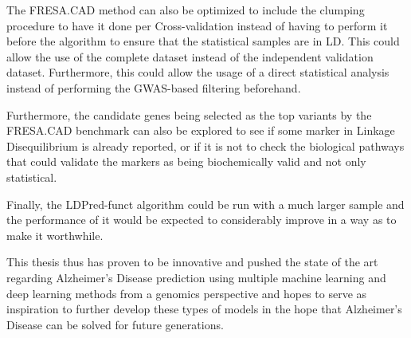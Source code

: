 The FRESA.CAD method can also be optimized to include the clumping procedure to have it done per Cross-validation instead of having to perform it before the algorithm to ensure that the statistical samples are in LD. This could allow the use of the complete dataset instead of the independent validation dataset. Furthermore, this could allow the usage of a direct statistical analysis instead of performing the GWAS-based filtering beforehand.

Furthermore, the candidate genes being selected as the top variants by the FRESA.CAD benchmark can also be explored to see if some marker in Linkage Disequilibrium is already reported, or if it is not to check the biological pathways that could validate the markers as being biochemically valid and not only statistical.

Finally, the LDPred-funct algorithm could be run with a much larger sample and the performance of it would be expected to considerably improve in a way as to make it worthwhile.

This thesis thus has proven to be innovative and pushed the state of the art regarding Alzheimer's Disease prediction using multiple machine learning and deep learning methods from a genomics perspective and hopes to serve as inspiration to further develop these types of models in the hope that Alzheimer's Disease can be solved for future generations.
